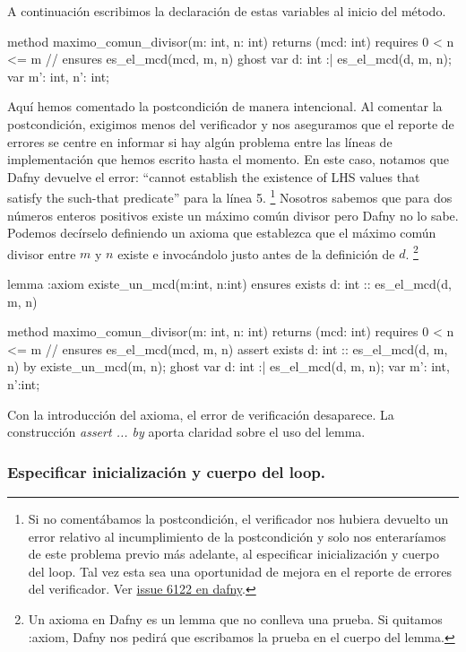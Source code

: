 \documentclass[12pt, a4paper, openany, fleqn]{book}
\begin{document}
    A continuación escribimos la declaración de estas variables al inicio del método.

    \begin{dafny}
method maximo_comun_divisor(m: int, n: int) returns (mcd: int)
    requires 0 < n <= m
    // ensures es_el_mcd(mcd, m, n)
{
    ghost var d: int :| es_el_mcd(d, m, n);
    var m': int, n': int;
}
    \end{dafny}

    Aquí hemos comentado la postcondición de manera intencional. Al comentar la postcondición, exigimos menos del verificador y nos aseguramos que el reporte de errores se centre en informar si hay algún problema entre las líneas de implementación que hemos escrito hasta el momento.
    En este caso, notamos que Dafny devuelve el error: ``cannot establish the existence of LHS values that satisfy the such-that predicate'' para la línea 5. \footnote{Si no comentábamos la postcondición, el verificador nos hubiera devuelto un error relativo al incumplimiento de la postcondición y solo nos enteraríamos de este problema previo más adelante, al especificar inicialización y cuerpo del loop. Tal vez esta sea una oportunidad de mejora en el reporte de errores del verificador. Ver \href{https://github.com/dafny-lang/dafny/issues/6122}{issue 6122 en dafny}.}
    Nosotros sabemos que para dos números enteros positivos existe un máximo común divisor pero Dafny no lo sabe. Podemos decírselo definiendo un axioma que establezca que el máximo común divisor entre $m$ y $n$ existe e invocándolo justo antes de la definición de $d$. \footnote{Un axioma en Dafny es un lemma que no conlleva una prueba. Si quitamos :axiom, Dafny nos pedirá que escribamos la prueba en el cuerpo del lemma.}

    \begin{dafny}
lemma {:axiom} existe_un_mcd(m:int, n:int)
    ensures exists d: int :: es_el_mcd(d, m, n)

method maximo_comun_divisor(m: int, n: int) returns (mcd: int)
    requires 0 < n <= m
    // ensures es_el_mcd(mcd, m, n)
{
    assert exists d: int :: es_el_mcd(d, m, n) by {
        existe_un_mcd(m, n);
    }
    ghost var d: int :| es_el_mcd(d, m, n);
    var m': int, n':int;
}
    \end{dafny}

    Con la introducción del axioma, el error de verificación desaparece. La construcción \textit{assert ... by} aporta claridad sobre el uso del lemma.

    \subsubsection{Especificar inicialización y cuerpo del loop.}
\end{document}

